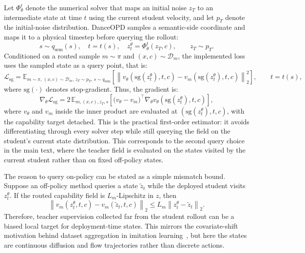 Let $\Phi_\theta^t$ denote the numerical solver that maps an initial noise $z_T$ to an intermediate state at time $t$ using the current student velocity, and let $p_T$ denote the initial-noise distribution. DanceOPD samples a semantic-side coordinate and maps it to a physical timestep before querying the rollout:
\begin{equation}
  s\sim q_{\mathrm{sem}}(s),\quad t=t(s),\quad z_t^\theta=\Phi_\theta^t(z_T,c), \qquad z_T\sim p_T.
  \label{eq:app-onpolicy-query}
\end{equation}
Conditioned on a routed sample $m\sim\pi$ and $(x,c)\sim\mathcal{D}_m$, the implemented loss uses the sampled state as a query point, that is:
\begin{equation}
  \mathcal{L}_{\mathrm{sg}}
  =
  \mathbb{E}_{m\sim\pi,\,(x,c)\sim\mathcal{D}_m,\,z_T\sim p_T,\,s\sim q_{\mathrm{sem}}}\left[
  \left\|
  v_\theta(\mathrm{sg}(z_t^\theta),t,c)
  -v_m(\mathrm{sg}(z_t^\theta),t,c)
  \right\|_2^2
  \right],\qquad t=t(s),
  \label{eq:app-sg-loss}
\end{equation}
where $\mathrm{sg}(\cdot)$ denotes stop-gradient. Thus, the gradient is:
\begin{equation}
  \nabla_\theta\mathcal{L}_{\mathrm{sg}}
  =
  2\,\mathbb{E}_{m,(x,c),z_T,s}\left[
  \bigl(v_\theta-v_m\bigr)^\top
  \nabla_\theta v_\theta(\mathrm{sg}(z_t^\theta),t,c)
  \right],
  \label{eq:app-sg-grad}
\end{equation}
where $v_\theta$ and $v_m$ inside the inner product are evaluated at $(\mathrm{sg}(z_t^\theta),t,c)$, with the capability target detached. This is the practical first-order estimator: it avoids differentiating through every solver step while still querying the field on the student's current state distribution. This corresponds to the second query choice in the main text, where the teacher field is evaluated on the states visited by the current student rather than on fixed off-policy states.

The reason to query on-policy can be stated as a simple mismatch bound. Suppose an off-policy method queries a state $\tilde z_t$ while the deployed student visits $z_t^\theta$. If the routed capability field is $L_m$-Lipschitz in $z$, then
\begin{equation}
  \left\|v_m(z_t^\theta,t,c)-v_m(\tilde z_t,t,c)\right\|_2
  \le L_m\left\|z_t^\theta-\tilde z_t\right\|_2.
  \label{eq:app-offpolicy-bound}
\end{equation}
Therefore, teacher supervision collected far from the student rollout can be a biased local target for deployment-time states. This mirrors the covariate-shift motivation behind dataset aggregation in imitation learning~\cite{ross2011reduction}, but here the states are continuous diffusion and flow trajectories rather than discrete actions.



